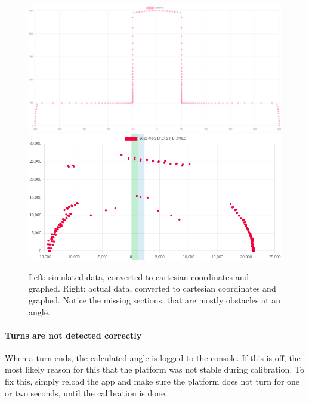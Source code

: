 \begin{figure}[H]
    \centering
    \includegraphics[width=0.45\linewidth]{figures/cartesian_simulated.png}
    \includegraphics[width=0.45\linewidth]{figures/cartesian_actual.png}
    \caption{Left: simulated data, converted to cartesian coordinates and
        graphed.
        Right: actual data, converted to cartesian coordinates and graphed.
        Notice the missing sections, that are mostly obstacles at an angle.}

    \label{fig:cartesian}
\end{figure}

\paragraph{Turns are not detected correctly} When a turn ends, the calculated angle is logged to the console. If this is off, the most likely reason for this that the platform was not stable during calibration. To fix this, simply reload the app and make sure the platform does not turn for one or two seconds, until the calibration is done.
